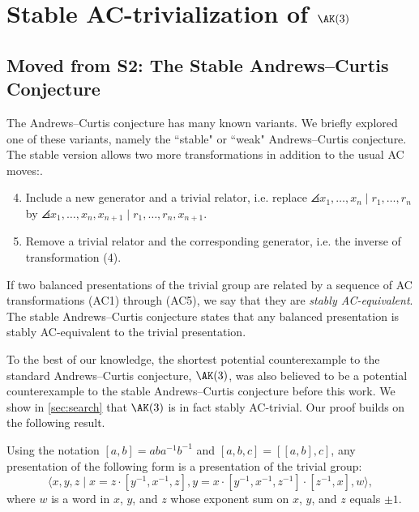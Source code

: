 
\section{Stable AC-trivialization of $\AK(3)$}\label{sec:stable_ak3}

\subsection*{Moved from S2: The Stable Andrews--Curtis Conjecture}\label{sec:stable_ac}

The Andrews--Curtis conjecture has many known variants.
 We briefly explored one of these variants, namely the ``stable" or ``weak" Andrews--Curtis conjecture.
The stable version allows two more transformations in addition to the usual AC moves:.

\begin{enumerate}[label=(AC\arabic*)]
	\setcounter{enumi}{3}
	\item Include a new generator and a trivial relator, i.e. replace $\angles{x_1, \dots, x_n \mid r_1, \dots, r_n}$ by $\angles{x_1, \dots, x_n, x_{n+1} \mid r_1, \dots, r_n, x_{n+1}}$.
	\item Remove a trivial relator and the corresponding generator, i.e. the inverse of transformation (4).
\end{enumerate}
If two balanced presentations of the trivial group are related by a sequence of AC transformations (AC1) through (AC5), we say that they are \textit{stably AC-equivalent}.
The stable Andrews--Curtis conjecture states that any balanced presentation is stably AC-equivalent to the trivial presentation.

To the best of our knowledge, the shortest potential counterexample to the standard Andrews--Curtis conjecture, $\AK(3)$, was also believed to be a potential counterexample to the stable Andrews--Curtis conjecture before this work.
We show in \autoref{sec:search} that $\AK(3)$ is in fact stably AC-trivial.
Our proof builds on the following result.

\begin{theorem*}\label{theorem:MMS}
	Using the notation $[a, b] = a b a^{-1} b^{-1}$ and $[a, b, c] = [[a, b], c]$, any presentation of the following form is a presentation of the trivial group:
	\[
	\langle x, y, z \mid x = z \cdot [y^{-1}, x^{-1}, z], y = x \cdot [y^{-1}, x^{-1}, z^{-1}] \cdot [z^{-1}, x], w \rangle,
	\]
	where $w$ is a word in $x$, $y$, and $z$ whose exponent sum on $x$, $y$, and $z$ equals $\pm 1$.
\end{theorem*}

